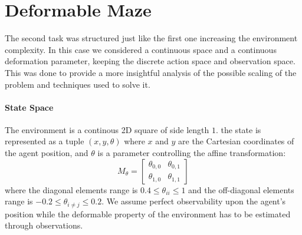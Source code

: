 \section{Deformable Maze}
The second task was structured just like the first one increasing the environment complexity.
In this case we considered a continuous space and a continuous deformation parameter, 
keeping the discrete action space and observation space. This was done to provide 
a more insightful analysis of the possible scaling of the problem and techniques 
used to solve it.
   
\paragraph{State Space}
The environment is a continous 2D square of side length $1$.
the state is represented as a tuple $(x,y, \theta)$ where $x$ and $y$ are the Cartesian coordinates of the agent position, 
and $\theta$ is a parameter controlling the affine transformation: 
$$M_{\theta} = 
\begin{bmatrix}
\theta_{0,0} & \theta_{0,1} \\
\theta_{1,0} & \theta_{1,1}
\end{bmatrix}
$$  
where the diagonal elements range is $0.4 \leq \theta_{ii} \leq 1$ and the 
off-diagonal elements range is $-0.2 \leq \theta_{i\neq j} \leq 0.2$.
We assume perfect observability upon the agent's position while the deformable property 
of the environment has to be estimated through observations.

